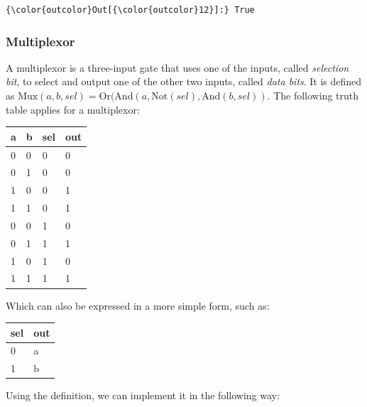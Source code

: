 \documentclass[11pt]{article}
\begin{document}
\begin{Verbatim}[commandchars=\\\{\}]
{\color{outcolor}Out[{\color{outcolor}12}]:} True
\end{Verbatim}
            
    \hypertarget{multiplexor}{%
\subsubsection{Multiplexor}\label{multiplexor}}

    A multiplexor is a three-input gate that uses one of the inputs, called
\emph{selection bit}, to select and output one of the other two inputs,
called \emph{data bits}. It is defined as
\(\text{Mux}(a,b,sel)=\text{Or}(\text{And}(a, \text{Not}(sel), \text{And}(b,sel))\).
The following truth table applies for a multiplexor:

\begin{longtable}[]{@{}llll@{}}
\toprule
a & b & sel & out\tabularnewline
\midrule
\endhead
0 & 0 & 0 & 0\tabularnewline
0 & 1 & 0 & 0\tabularnewline
1 & 0 & 0 & 1\tabularnewline
1 & 1 & 0 & 1\tabularnewline
0 & 0 & 1 & 0\tabularnewline
0 & 1 & 1 & 1\tabularnewline
1 & 0 & 1 & 0\tabularnewline
1 & 1 & 1 & 1\tabularnewline
\bottomrule
\end{longtable}

Which can also be expressed in a more simple form, such as:

\begin{longtable}[]{@{}ll@{}}
\toprule
sel & out\tabularnewline
\midrule
\endhead
0 & a\tabularnewline
1 & b\tabularnewline
\bottomrule
\end{longtable}

Using the definition, we can implement it in the following way:
\end{document}

